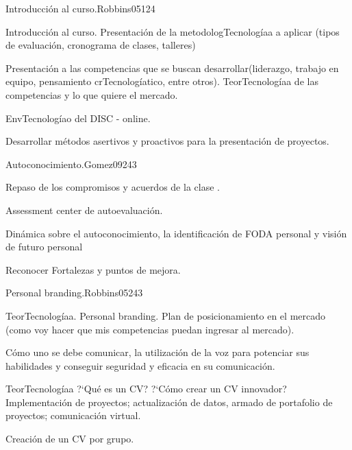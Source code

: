 \begin{syllabus}
\begin{unit}{Introducción al curso.}{}{Robbins05}{12}{4}
   \begin{topics}
      \item Introducción al curso. Presentación de la metodologTecnologíaa a aplicar (tipos de evaluación, cronograma de clases, talleres)
      \item Presentación a las competencias que se buscan desarrollar(liderazgo, trabajo en equipo, pensamiento crTecnologíatico, entre otros). TeorTecnologíaa de las competencias y lo que quiere el mercado.
      \item EnvTecnologíao del DISC - online.
   \end{topics}
   \begin{learningoutcomes}
      \item Desarrollar métodos asertivos y proactivos para la presentación de proyectos.
   \end{learningoutcomes}
\end{unit}

\begin{unit}{Autoconocimiento.}{}{Gomez09}{24}{3}
   \begin{topics}
      \item Repaso de los compromisos y acuerdos de la clase .
      \item Assessment center de autoevaluación.
      \item Dinámica sobre el autoconocimiento, la identificación de FODA personal y visión de futuro personal
   \end{topics}

   \begin{learningoutcomes}
      \item Reconocer Fortalezas y puntos de mejora.
      \end{learningoutcomes}
\end{unit}

\begin{unit}{Personal branding.}{}{Robbins05}{24}{3}
   \begin{topics}
      \item TeorTecnologíaa. Personal branding. Plan de posicionamiento en el mercado (como voy hacer que mis competencias puedan ingresar al mercado).
      \item Cómo uno se debe comunicar, la utilización de la voz para potenciar sus habilidades y conseguir seguridad y eficacia en su comunicación.
      \item TeorTecnologíaa ?`Qué es un CV? ?`Cómo crear un CV innovador? Implementación de proyectos; actualización de datos, armado de portafolio de proyectos; comunicación virtual.
      \item Creación de un CV por grupo.
   \end{topics}


\end{unit}
\end{syllabus}
